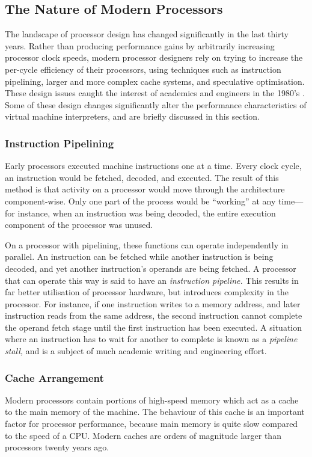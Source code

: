 		\subsection{The Nature of Modern Processors}
			The landscape of processor design has changed significantly in the last thirty years. Rather than producing performance gains by arbitrarily increasing processor clock speeds, modern processor designers rely on trying to increase the per-cycle efficiency of their processors, using techniques such as instruction pipelining, larger and more complex cache systems, and speculative optimisation. These design issues caught the interest of academics and engineers in the 1980's \citep{modernprocessordesign}. Some of these design changes significantly alter the performance characteristics of virtual machine interpreters, and are briefly discussed in this section.
			
			\subsubsection{Instruction Pipelining}
			Early processors executed machine instructions one at a time. Every clock cycle, an instruction would be fetched, decoded, and executed. The result of this method is that activity on a processor would move through the architecture component-wise. Only one part of the process would be ``working'' at any time---for instance, when an instruction was being decoded, the entire execution component of the processor was unused.
			
			On a processor with pipelining, these functions can operate independently in parallel. An instruction can be fetched while another instruction is being decoded, and yet another instruction's operands are being fetched. A processor that can operate this way is said to have an \emph{instruction pipeline.} This results in far better utilisation of processor hardware, but introduces complexity in the processor. For instance, if one instruction writes to a memory address, and later instruction reads from the same address, the second instruction cannot complete the operand fetch stage until the first instruction has been executed. A situation where an instruction has to wait for another to complete is known as a \emph{pipeline stall,} and is a subject of much academic writing and engineering effort.
			
			\subsubsection{Cache Arrangement}
			Modern processors contain portions of high-speed memory which act as a cache to the main memory of the machine. The behaviour of this cache is an important factor for processor performance, because main memory is quite slow compared to the speed of a CPU. Modern caches are orders of magnitude larger than processors twenty years ago. 
			
